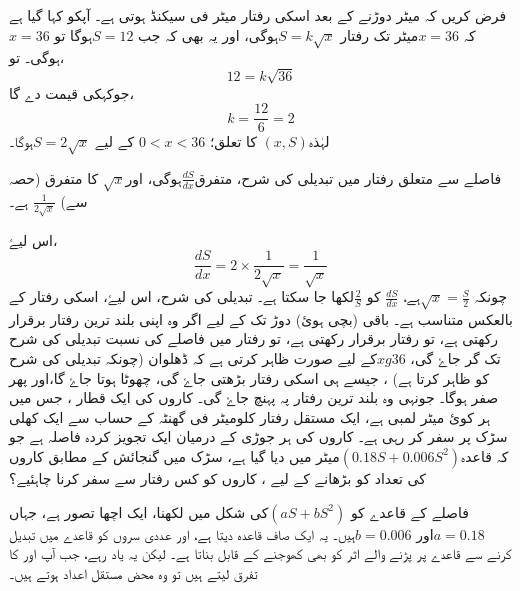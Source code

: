 فرض کریں کہ  میٹر دوڑنے کے بعد اسکی رفتار میٹر فی سیکنڈ ہوتی ہے۔ آپکو کہا گیا ہے کہ $x=36 $میٹر تک رفتار  $S=k\sqrt{x} $ہوگی، اور یہ بھی کہ جب  $S=12$ہوگا تو  $x=36$ ہوگی۔ تو،
\[12=k\sqrt{36}\]
جوکہکی قیمت دے گا،
\[ k=\frac{12}{6}=2\]
لہٰذہ\(   (x,S)    \)  کا تعلق؛
\(   0<x<36 \)
 کے لیے \( S=2\sqrt{x}  \)ہوگا۔

فاصلے سے متعلق رفتار میں تبدیلی کی شرح، متفرق$\frac{dS}{dx}$ہوگی، اور$\sqrt{x}$ کا متفرق (حصہ   سے)   $\frac{1}{2\sqrt{x}}$ ہے۔ 
  
اس لیۓ،
$$ \frac{dS}{dx}=2 \times \frac{1}{2\sqrt{x}}=\frac{1}{\sqrt{x}} $$
چونکہ  \(   \sqrt{x}=\frac{S}{2}    \)ہے، \(   \frac{dS}{dx}    \) کو \(\frac{2}{S}\)لکھا جا سکتا ہے۔ تبدیلی کی شرح، اس لیۓ، اسکی رفتار کے بالعکس متناسب ہے۔
باقی (بچی ہوئ) دوڑ تک کے لیے اگر وہ اپنی بلند ترین رفتار برقرار رکھتی ہے، تو رفتار برقرار رکھتی ہے، تو رفتار میں فاصلے کی نسبت تبدیلی کی شرح   تک گر جاۓ گی،    \(   xg36    \)کے لیے صورت   ظاہر کرتی ہے کہ ڈھلوان (چونکہ تبدیلی کی شرح کو ظاہر کرتا ہے) ، جیسے ہی اسکی رفتار بڑھتی جاۓ گی، چھوٹا ہوتا جاۓ گا،اور پھر صفر ہوگا۔ جونہی وہ بلند ترین رفتار پہ پہنچ جاۓ گی۔
%
کاروں کی ایک قطار ، جس میں ہر کوئ    میٹر لمبی ہے، ایک مستقل رفتار    کلومیٹر فی گھنٹہ کے حساب سے ایک کھلی سڑک پر سفر کر رہی ہے۔ کاروں کی ہر جوڑی کے درمیان ایک تجویز کردہ فاصلہ ہے جو کہ قاعدہ\( (0.18S+0.006S^2)\)میٹر میں دیا گیا ہے، سڑک میں گنجائش کے مطابق کاروں کی تعداد کو بڑھانے کے لیے ، کاروں کو کس رفتار سے سفر کرنا چاہئیے؟

فاصلے کے قاعدے  کو  \((aS+bS^2)\)کی شکل میں لکھنا، ایک اچھا تصور ہے، جہاں \(a=0.18 \)اور  \(b=0.006\)ہیں۔ یہ ایک صاف قاعدہ دیتا ہے، اور عددی سروں کو قاعدے میں تبدیل کرنے سے قاعدے پر پڑنے والے اثر کو بھی کھوجنے کے قابل بناتا ہے۔ لیکن یہ یاد رہے، جب آپ  اور  کا تفرق لیتے ہیں تو وہ محض مستقل اعداد ہوتے ہیں۔

